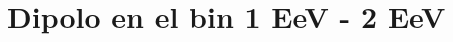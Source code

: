 % 

% 

\section{Dipolo en el bin 1 EeV - 2 EeV}
\graphicspath{{report_6_02_06_2020/}}




% 







